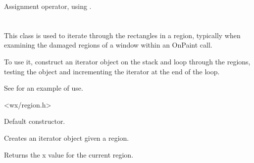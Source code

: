 \label{wxregionassign}


Assignment operator, using .



\section{}\label{wxregioniterator}

This class is used to iterate through the rectangles in a region,
typically when examining the damaged regions of a window within an OnPaint call.

To use it, construct an iterator object on the stack and loop through the
regions, testing the object and incrementing the iterator at the end of the loop.

See  for an example of use.




<wx/region.h>







\label{wxregioniteratorctor}


Default constructor.


Creates an iterator object given a region.


\label{wxregioniteratorgetx}


Returns the x value for the current region.


\label{wxregioniteratorgety}


